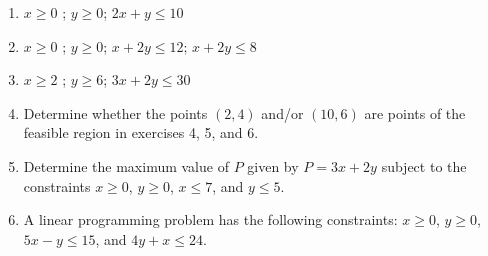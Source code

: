 \documentclass[
  letterpaper,
  DIV=11,
  numbers=noendperiod]{scrreprt}
\begin{document}
\begin{enumerate}
\def\labelenumi{\arabic{enumi}.}
\setcounter{enumi}{3}
\item
  \(x\ge 0\) ; \(y\ge 0\); \(2x+y\le10\)
\item
  \(x\ge 0\) ; \(y\ge 0\); \(x+2y\le12\); \(x+2y\le8\)
\item
  \(x\ge 2\) ; \(y\ge 6\); \(3x+2y\le30\)
\item
  Determine whether the points \((2,4)\) and/or \((10,6)\) are points of
  the feasible region in exercises 4, 5, and 6.
\item
  Determine the maximum value of \(P\) given by \(P=3x+2y\) subject to
  the constraints \(x\ge 0\), \(y\ge 0\), \(x\le 7\), and \(y\le 5\).
\item
  A linear programming problem has the following constraints: \(x\ge0\),
  \(y\ge0\), \(5x-y\le15\), and \(4y+x\le24\).


\end{enumerate}
\end{document}
